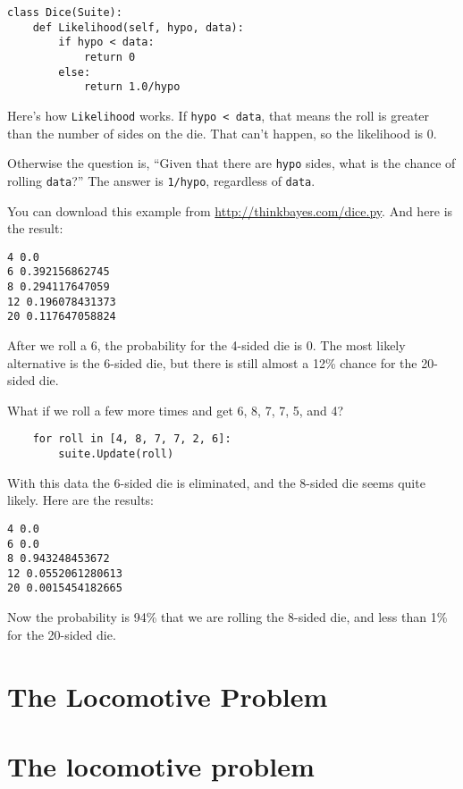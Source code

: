 \documentclass[12pt]{book}
\begin{document}
\begin{verbatim}
class Dice(Suite):
    def Likelihood(self, hypo, data):
        if hypo < data:
            return 0
        else:
            return 1.0/hypo
\end{verbatim}

Here's how \verb"Likelihood" works.  If \verb"hypo < data", that
means the roll is greater than the number of sides on the die.
That can't happen, so the likelihood is 0.

Otherwise the question is, ``Given that there are {\tt hypo}
sides, what is the chance of rolling {\tt data}?''  The
answer is \verb"1/hypo", regardless of {\tt data}.

You can download this example from \url{http://thinkbayes.com/dice.py}.
And here is the result:

\begin{verbatim}
4 0.0
6 0.392156862745
8 0.294117647059
12 0.196078431373
20 0.117647058824
\end{verbatim}

After we roll a 6, the probability for the 4-sided die is 0.  The
most likely alternative is the 6-sided die, but there is still
almost a 12\% chance for the 20-sided die.

What if we roll a few more times and get 6, 8, 7, 7, 5, and 4?

\begin{verbatim}
    for roll in [4, 8, 7, 7, 2, 6]:
        suite.Update(roll)
\end{verbatim}

With this data the 6-sided die is eliminated, and the 8-sided
die seems quite likely.  Here are the results:

\begin{verbatim}
4 0.0
6 0.0
8 0.943248453672
12 0.0552061280613
20 0.0015454182665
\end{verbatim}

Now the probability is 94\% that we are rolling the 8-sided die,
and less than 1\% for the 20-sided die.

\section{The Locomotive Problem}

\section{The locomotive problem}
\end{document}
